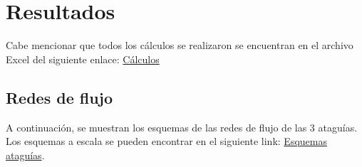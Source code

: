 \documentclass{article}
\begin{document}
\newpage

\section{Resultados}
Cabe mencionar que todos los cálculos se realizaron se encuentran en el archivo Excel del siguiente enlace: \href{https://github.com/berckanala/Proyecto-1-MCOC/tree/main/Codigos_calculos}{Cálculos}
\subsection{Redes de flujo}
A continuación, se muestran los esquemas de las redes de flujo de las 3 ataguías. Los esquemas a escala se pueden encontrar en el siguiente link: \href{https://github.com/berckanala/Proyecto-1-MCOC/tree/main/redes_flujo}{Esquemas ataguías}.
\end{document}
